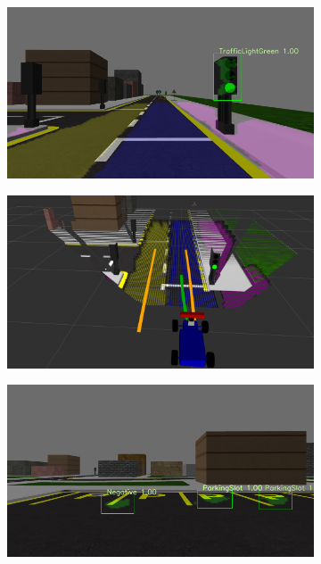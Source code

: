 \begin{figure}[h]
\begin{subfigure}[b]{0.45\linewidth}
  \end{subfigure}
  \begin{subfigure}[b]{0.45\linewidth}
    \includegraphics[width=\linewidth]{figures/experiments/green-light-go-img.png}
  \end{subfigure}
  \begin{subfigure}[b]{0.45\linewidth}
    \includegraphics[width=\linewidth]{figures/experiments/green-light-go-pc.png}
  \end{subfigure}
  \begin{subfigure}[b]{0.45\linewidth}
    \includegraphics[width=\linewidth]{figures/experiments/parking-slot-img.png}

\end{subfigure}
\end{figure}
